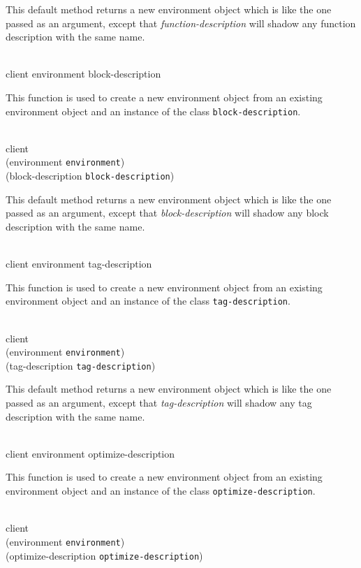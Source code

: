 This default method returns a new environment object which is like the
one passed as an argument, except that \textit{function-description}
will shadow any function description with the same name.

\\
            {client environment block-description}

This function is used to create a new environment object from an
existing environment object and an instance of the class
\texttt{block-description}.

\\
           {client\\
            (environment {\tt environment})\\
            (block-description {\tt block-description})}

This default method returns a new environment object which is like the
one passed as an argument, except that \textit{block-description}
will shadow any block description with the same name.

\\
            {client environment tag-description}

This function is used to create a new environment object from an
existing environment object and an instance of the class
\texttt{tag-description}.

\\
           {client\\
            (environment {\tt environment})\\
            (tag-description {\tt tag-description})}

This default method returns a new environment object which is like the
one passed as an argument, except that \textit{tag-description}
will shadow any tag description with the same name.

\\
            {client environment optimize-description}

This function is used to create a new environment object from an
existing environment object and an instance of the class
\texttt{optimize-description}.

\\
           {client\\
            (environment {\tt environment})\\
            (optimize-description {\tt optimize-description})}

